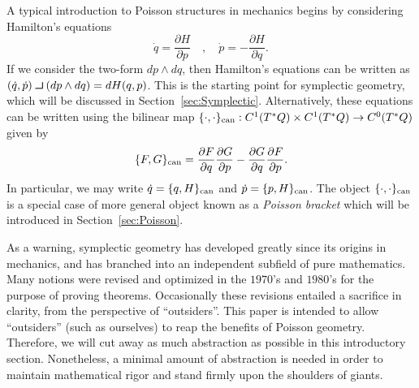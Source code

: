 \documentclass[12pt]{amsart}
\newcommand{\pder}[2]{\ensuremath{\frac{\partial #1}{\partial #2}}}
\def\contract{\makebox[1.2em][c]{\mbox{\rule{.6em}
{.01truein}\rule{.01truein}{.6em}}}}
\begin{document}
A typical introduction to Poisson structures in mechanics
begins by considering Hamilton's equations
\begin{equation*}
  \dot{q} = \pder{H}{p} \quad, \quad  \dot{p} = - \pder{H}{q}.
\end{equation*}
If we consider the two-form $dp \wedge dq$, then Hamilton's equations
can be written as $(\dot{q},\dot{p}) \contract (dp \wedge dq) = dH(q,p)$.
This is the starting point for symplectic geometry, which
will be discussed in Section~\ref{sec:Symplectic}.
Alternatively, these equations can be written using the bilinear map $\{ \cdot , \cdot \}_{\rm can} : C^1( T^*Q) \times C^1(T^*Q) \to C^0(T^*Q)$
given by
\begin{equation*}
  \{ F , G \}_{\rm can} = \pder{F}{q}\pder{G}{p} - \pder{G}{q} \pder{F}{p}.
\end{equation*}
In particular, we may write $\dot{q} = \{ q , H \}_{\rm can}$ and $\dot{p} = \{ p , H\}_{\rm can}$.
The object $\{ \cdot , \cdot \}_{\rm can}$ is a special case of more general
object known as a \emph{Poisson bracket} which will be introduced in
Section~\ref{sec:Poisson}.

As a warning, symplectic geometry has developed greatly
since its origins in mechanics, and
has branched into an independent subfield of pure mathematics.
Many notions were revised and optimized in the $1970$'s and $1980$'s for
the purpose of proving theorems.
Occasionally these revisions entailed a sacrifice
in clarity, from the perspective of ``outsiders''.
This paper is intended to allow ``outsiders''
(such as ourselves) to reap the benefits of Poisson geometry.
Therefore, we will cut away as much abstraction as possible in this introductory
section.
Nonetheless, a minimal amount of abstraction is needed in order to
maintain mathematical rigor and stand firmly upon the shoulders of giants.
\end{document}
